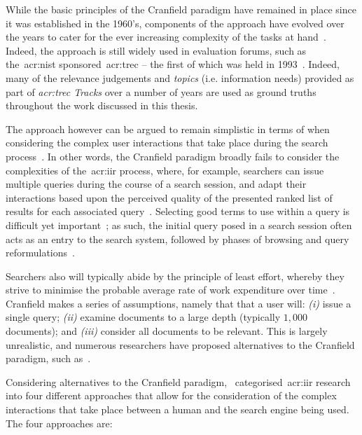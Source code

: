While the basic principles of the Cranfield paradigm have remained in place since it was established in the 1960's, components of the approach have evolved over the years to cater for the ever increasing complexity of the tasks at hand~\citep{harman2010cranfield}. Indeed, the approach is still widely used in evaluation forums, such as the~\gls{acr:nist} sponsored~\gls{acr:trec} -- the first of which was held in 1993~\citep{harman1993trec1}. Indeed, many of the relevance judgements and \emph{topics} (i.e. information needs) provided as part of \emph{\gls{acr:trec} Tracks} over a number of years are used as ground truths throughout the work discussed in this thesis.

The approach however can be argued to remain simplistic in terms of when considering the complex user interactions that take place during the search process~\citep{borlund2000evaluation_iir,ingwersen2005theturn}. In other words, the Cranfield paradigm broadly fails to consider the complexities of the~\gls{acr:iir} process, where, for example, searchers can issue multiple queries during the course of a search session, and adapt their interactions based upon the perceived quality of the presented ranked list of results for each associated query~\citep{moffat2013users_versus_models}. Selecting good terms to use within a query is difficult yet important~\citep{efthimiadis2000query_expansion}; as such, the initial query posed in a search session often acts as an entry to the search system, followed by phases of browsing and query reformulations~\citep{marchionini1993information_seeking}.

Searchers also will typically abide by the principle of least effort, whereby they strive to minimise the probable average rate of work expenditure over time~\citep{zipf1949behaviour}. Cranfield makes a series of assumptions, namely that that a user will: \emph{(i)} issue a single query; \emph{(ii)} examine documents to a large depth (typically $1,000$ documents); and \emph{(iii)} consider all documents to be relevant. This is largely unrealistic, and numerous researchers have proposed alternatives to the Cranfield paradigm, such as~\cite{borlund2003iir_model}.

Considering alternatives to the Cranfield paradigm,~\cite{keskustalo2008user_simulation} categorised~\gls{acr:iir} research into four different approaches that allow for the consideration of the complex interactions that take place between a human and the search engine being used. The four approaches are:

